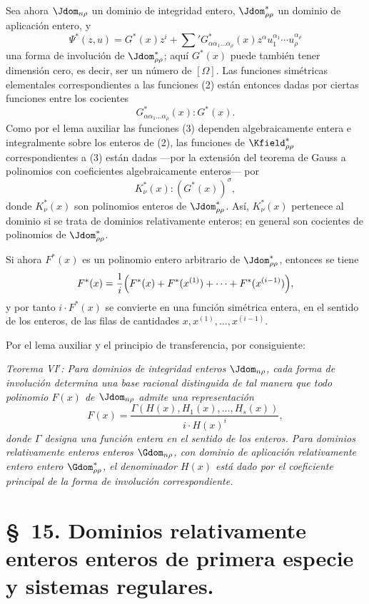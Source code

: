 \documentclass[11pt]{article}
\begin{document}
Sea ahora $\Jdom_{n\rho}$ un dominio de integridad entero, $\Jdom^*_{\rho\rho}$ un dominio de aplicación entero, y
\[
  \Psi^*(z,u)=G^*(x)z^i+
  \sum{}'G^*_{\alpha\alpha_1\ldots\alpha_\rho}(x)
  z^\alpha u_1^{\alpha_1}\cdots u_\rho^{\alpha_\rho}
\]
una forma de involución de $\Jdom^*_{\rho\rho}$; aquí $G^*(x)$ puede también tener dimensión cero, es decir, ser un número de $[\Omega]$. Las funciones simétricas elementales correspondientes a las funciones (2) están entonces dadas por ciertas funciones entre los cocientes
\begin{equation}
  G^*_{\alpha\alpha_1\ldots\alpha_\rho}(x):G^*(x).
\tag{4}
\end{equation}
Como por el lema auxiliar las funciones (3) dependen algebraicamente entera e integralmente sobre los enteros de (2), las funciones de $\Kfield^*_{\rho\rho}$ correspondientes a (3) están dadas ---por la extensión del teorema de Gauss a polinomios con coeficientes algebraicamente enteros--- por
\begin{equation}
  K_\nu^*(x):(G^*(x))^\sigma,
\tag{5}
\end{equation}
donde $K_\nu^*(x)$ son polinomios enteros de $\Jdom^*_{\rho\rho}$. Así, $K_\nu^*(x)$ pertenece al dominio si se trata de dominios relativamente enteros; en general son cocientes de polinomios de $\Jdom^*_{\rho\rho}$.

Si ahora $F^*(x)$ es un polinomio entero arbitrario de $\Jdom^*_{\rho\rho}$, entonces se tiene
\[
  F^*(x)=\frac1i\Bigl(F^*(x)+F^*(x^{(1)})+\cdots+F^*(x^{(i-1)})\Bigr),
\]
y por tanto $i\cdot F^*(x)$ se convierte en una función simétrica entera, en el sentido de los enteros, de las filas de cantidades $x,x^{(1)},\ldots,x^{(i-1)}$.

Por el lema auxiliar y el principio de transferencia, por consiguiente:

\emph{Teorema VI$'$: Para dominios de integridad enteros $\Jdom_{n\rho}$, cada forma de involución determina una base racional distinguida de tal manera que todo polinomio $F(x)$ de $\Jdom_{n\rho}$ admite una representación}
\[
  F(x)=\frac{\Gamma(H(x),H_1(x),\ldots,H_s(x))}{i\cdot H(x)^i},
\]
\emph{donde $\Gamma$ designa una función entera en el sentido de los enteros. Para dominios relativamente enteros enteros $\Gdom_{n\rho}$, con dominio de aplicación relativamente entero entero $\Gdom^*_{\rho\rho}$, el denominador $H(x)$ está dado por el coeficiente principal de la forma de involución correspondiente.}

\section*{\S\ 15. Dominios relativamente enteros enteros de primera especie y sistemas regulares.}
\end{document}
